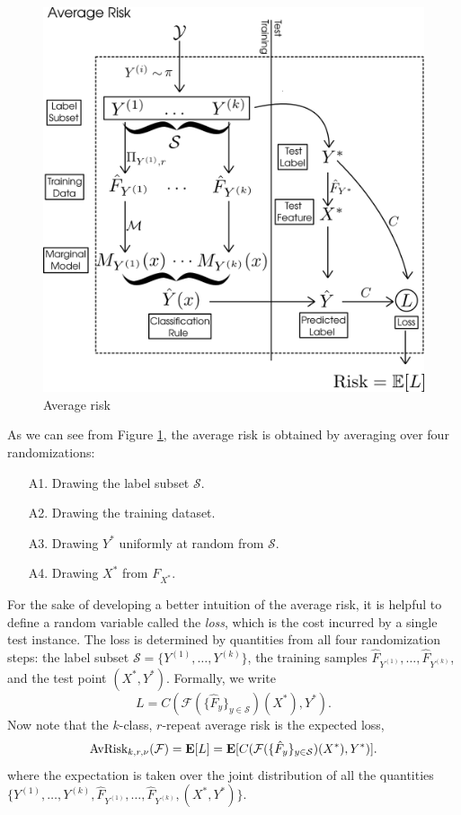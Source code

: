 \begin{figure}[h]
\centering
\includegraphics[scale = 0.3]{../extrapolation_figures/average_risk.png}
\caption{Average risk}\label{fig:average_risk2}
\end{figure}

As we can see from Figure \ref{fig:average_risk2}, the average risk is obtained by averaging
over four randomizations:
\begin{enumerate}
\item[A1.] Drawing the label subset $\mathcal{S}$.
\item[A2.] Drawing the training dataset.
\item[A3.] Drawing $Y^*$ uniformly at random from $\mathcal{S}$.
\item[A4.] Drawing $X^*$ from $F_{X^*}$.
\end{enumerate}

For the sake of developing a better intuition of the average risk, it
is helpful to define a random variable called the \emph{loss}, which
is the cost incurred by a single test instance.  The loss is
determined by quantities from all four randomization steps: the label
subset $\mathcal{S} = \{Y^{(1)},\hdots, Y^{(k)}\}$, the training
samples $\hat{F}_{Y^{(1)}},\hdots, \hat{F}_{Y^{(k)}}$, and the test
point $(X^*, Y^*)$.  Formally, we write
\[
L = C(\mathcal{F}(\{\hat{F}_y\}_{y \in \mathcal{S}})(X^*), Y^*).
\]
Now note that the $k$-class, $r$-repeat average risk is the expected loss,
\begin{equation}\label{eq:avrisk_EL}
\text{AvRisk}_{k, r, \nu}(\mathcal{F}) = \textbf{E}[L] = \textbf{E}[C(\mathcal{F}(\{\hat{F}_y\}_{y \in \mathcal{S}})(X^*), Y^*)].
\end{equation}
where the expectation is taken over the joint distribution of all the
quantities $\{Y^{(1)},\hdots,
Y^{(k)}, \hat{F}_{Y^{(1)}},\hdots, \hat{F}_{Y^{(k)}}, (X^*, Y^*)\}$.

